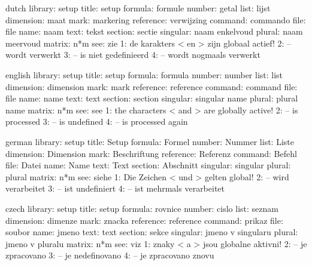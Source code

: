 
\startmessages  dutch  library: setup  
        title:  setup
      formula:  formule
       number:  getal
         list:  lijst
    dimension:  maat 
         mark:  markering
    reference:  verwijzing
      command:  commando
         file:  file
         name:  naam
         text:  tekst
      section:  sectie
     singular:  naam enkelvoud
       plural:  naam meervoud
       matrix:  n*m
          see:  zie
            1:  de karakters < en > zijn globaal actief!
            2:  -- wordt verwerkt
            3:  -- is niet gedefinieerd
            4:  -- wordt nogmaals verwerkt
\stopmessages

\startmessages  english  library: setup  
        title:  setup
      formula:  formula
       number:  number
         list:  list
    dimension:  dimension 
         mark:  mark
    reference:  reference
      command:  command
         file:  file
         name:  name
         text:  text
      section:  section
     singular:  singular name 
       plural:  plural name 
       matrix:  n*m
          see:  see 
            1:  the characters < and > are globally active!
            2:  -- is processed
            3:  -- is undefined
            4:  -- is processed again
\stopmessages

\startmessages  german library: setup
        title:  Setup
      formula:  Formel
       number:  Nummer
         list:  Liste
    dimension:  Dimension
         mark:  Beschriftung
    reference:  Referenz
      command:  Befehl
         file:  Datei
         name:  Name
         text:  Text
      section:  Abschnitt
     singular:  singular
       plural:  plural
       matrix:  n*m
          see:  siehe
            1:  Die Zeichen < und > gelten global!
            2:  -- wird verarbeitet
            3:  -- ist undefiniert
            4:  -- ist mehrmals verarbeitet
\stopmessages

\startmessages  czech  library: setup
        title:  setup
      formula:  rovnice
       number:  cislo
         list:  seznam
    dimension:  dimenze
         mark:  znacka
    reference:  reference
      command:  prikaz
         file:  soubor
         name:  jmeno
         text:  text
      section:  sekce
     singular:  jmeno v singularu
       plural:  jmeno v pluralu
       matrix:  n*m
          see:  viz
            1:  znaky < a > jsou globalne aktivni!
            2:  -- je zpracovano
            3:  -- je nedefinovano
            4:  -- je zpracovano znovu
\stopmessages

